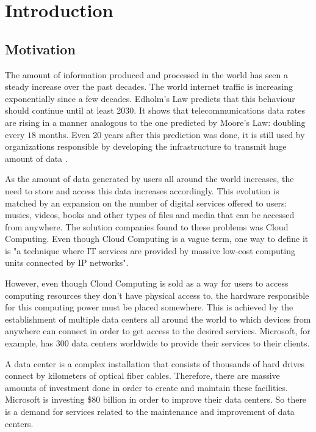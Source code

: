 \chapter{Introduction}\label{chap:introduction}

\section{Motivation}\label{sec:motivation}

The amount of information produced and processed in the world has seen a steady increase over the past decades.
The world internet traffic is increasing exponentially since a few decades.
Edholm's Law\cite{Edholm04} predicts that this behaviour should continue until at least 2030.
It shows that telecommunications data rates are rising in a manner analogous to the one predicted by Moore's Law\cite{Moore98}: doubling every $18$ months.
Even 20 years after this prediction was done, it is still used by organizations responsible by developing the infrastructure to transmit huge amount of data \cite{Mammela17}.

As the amount of data generated by users all around the world increases, the need to store and access this data increases accordingly.
This evolution is matched by an expansion on the number of digital services offered to users: musics, videos, books and other types of files and media that can be accessed from anywhere.
The solution companies found to these problems was Cloud Computing.
Even though Cloud Computing is a vague term, one way to define it is "a technique where IT services are provided by massive low-cost computing units connected by IP networks"\cite{Qian09}.

However, even though Cloud Computing is sold as a way for users to access computing resources they don't have physical access to, the hardware responsible for this computing power must be placed somewhere.
This is achieved by the establishment of multiple data centers all around the world to which devices from anywhere can connect in order to get access to the desired services.
Microsoft, for example, has 300 data centers worldwide to provide their services to their clients\cite{MicrosoftDataCenters}.

A data center is a complex installation that consists of thousands of hard drives connect by kilometers of optical fiber cables.
Therefore, there are massive amounts of investment done in order to create and maintain these facilities.
Microsoft is investing \$80 billion in order to improve their data centers\cite{MicrosoftDataCenters}.
So there is a demand for services related to the maintenance and improvement of data centers.


